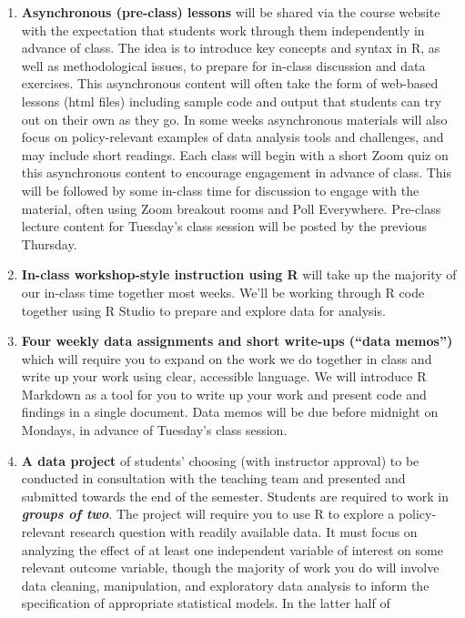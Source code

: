 \documentclass[11pt,]{article}
\begin{document}
\begin{enumerate}
\def\labelenumi{\arabic{enumi}.}
\item
  \textbf{Asynchronous (pre-class) lessons} will be shared via the
  course website with the expectation that students work through them
  independently in advance of class. The idea is to introduce key
  concepts and syntax in R, as well as methodological issues, to prepare
  for in-class discussion and data exercises. This asynchronous content
  will often take the form of web-based lessons (html files) including
  sample code and output that students can try out on their own as they
  go. In some weeks asynchronous materials will also focus on
  policy-relevant examples of data analysis tools and challenges, and
  may include short readings. Each class will begin with a short Zoom
  quiz on this asynchronous content to encourage engagement in advance
  of class. This will be followed by some in-class time for discussion
  to engage with the material, often using Zoom breakout rooms and Poll
  Everywhere. Pre-class lecture content for Tuesday's class session will
  be posted by the previous Thursday.
\item
  \textbf{In-class workshop-style instruction using R} will take up the
  majority of our in-class time together most weeks. We'll be working
  through R code together using R Studio to prepare and explore data for
  analysis.
\item
  \textbf{Four weekly data assignments and short write-ups (``data
  memos'')} which will require you to expand on the work we do together
  in class and write up your work using clear, accessible language. We
  will introduce R Markdown as a tool for you to write up your work and
  present code and findings in a single document. Data memos will be due
  before midnight on Mondays, in advance of Tuesday's class session.
\item
  \textbf{A data project} of students' choosing (with instructor
  approval) to be conducted in consultation with the teaching team and
  presented and submitted towards the end of the semester. Students are
  required to work in \emph{\textbf{groups of two}}. The project will
  require you to use R to explore a policy-relevant research question
  with readily available data. It must focus on analyzing the effect of
  at least one independent variable of interest on some relevant outcome
  variable, though the majority of work you do will involve data
  cleaning, manipulation, and exploratory data analysis to inform the
  specification of appropriate statistical models. In the latter half of

\end{enumerate}
\end{document}
